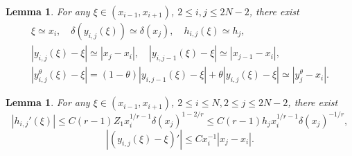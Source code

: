 \documentclass{amsart}
\newtheorem{lemma}[theorem]{Lemma}
\theoremstyle{definition}
\theoremstyle{remark}
\numberwithin{equation}{section}
\begin{document}
\begin{lemma} \label{lmm:gen-prop-of-MTFs}
  For any \(\xi \in (x_{i-1}, x_{i+1})\), \(2 \le i,j \le 2N-2\), there exist
  \begin{gather*}
    \xi \simeq x_i, \quad \delta(y_{i,j}(\xi))\simeq \delta(x_j), \quad h_{i,j}(\xi) \simeq h_j, \\
    |y_{i,j}(\xi) - \xi| \simeq |x_j - x_i|, \quad |y_{i,j-1}(\xi) - \xi| \simeq |x_{j-1} - x_i|, \\
    |y_{i,j}^\theta(\xi) - \xi| = (1-\theta)|y_{i,j-1}(\xi) - \xi| + \theta |y_{i,j}(\xi) - \xi| \simeq |y_j^\theta - x_i|.
  \end{gather*}
\end{lemma}




\begin{lemma} \label{lmm:esitmate-of-MTFs-1}
  For any \(\xi \in (x_{i-1}, x_{i+1}) \), \(2\le i \le N, 2\le j \le 2N-2\), there exist
  \begin{equation*}
    |h_{i,j}'(\xi)| \le C (r-1) Z_1 x_i^{1/r-1}  \delta(x_j)^{1-2/r}
    \le C(r-1) h_j x_i^{1/r-1} \delta(x_j)^{-1/r},
  \end{equation*}
  \begin{equation*}
    \left|(y_{i,j}(\xi) - \xi)'\right| \le C x_i^{-1} |x_j - x_i|.
  \end{equation*}
\end{lemma}
\end{document}
